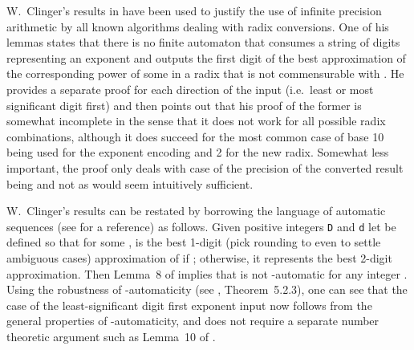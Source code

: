 \documentclass[12pt]{article}
\begin{document}
W.~Clinger's results in \cite{Clinger} have been used to justify the
use of infinite precision 
arithmetic by all known algorithms dealing with radix
conversions. One of his lemmas states that there
is no finite automaton that consumes a string of digits representing
an exponent and outputs the first digit of the best approximation of
the corresponding power of some {\ttD} in a radix that is not
commensurable with {\ttD}. He provides a separate proof for each direction of the input 
(i.e.~least or most significant digit first) and then points
out that his proof of the former is
somewhat incomplete in the sense that it does not work for all possible radix
combinations, although it does succeed for the most common case of base 10
being used for the exponent encoding and 2 for the new radix. Somewhat less important,
the proof only deals with case of the precision
of the converted result being  and not  as would seem
intuitively sufficient.

\iffalse
W.~Clinger's results can be restated by borrowing the language of automatic
sequences (see \cite{Allouche} for a reference) as follows.
Given positive integers {\tt D} and {\tt d} let  be
defined so that for some ,  is the best
1-digit (for simplicity, assume , and pick rounding to even
to settle ambiguous cases) approximation of
. Then Lemma~8 of \cite{Clinger} implies that 
 is not -automatic for any integer
. Using the robustness of -automaticity (see
\cite{Allouche}, Theorem~5.2.3), one can see that the case of the
least-significant digit first exponent input now follows from the general
properties of -automaticity, and does not require a separate
number theoretic argument such as Lemma~10 of \cite{Clinger}. 
\fi

W.~Clinger's results can be restated by borrowing the language of automatic
sequences (see \cite{Allouche} for a reference) as follows.
Given positive integers {\tt D} and {\tt d} let  be
defined so that for some ,  is the best
1-digit (pick rounding to even to settle ambiguous cases)
approximation of  if ;
otherwise, it represents the best 2-digit approximation.
Then Lemma~8 of \cite{Clinger} implies that 
 is not -automatic for any integer
. Using the robustness of -automaticity (see
\cite{Allouche}, Theorem~5.2.3), one can see that the case of the
least-significant digit first exponent input now follows from the general
properties of -automaticity, and does not require a separate
number theoretic argument such as Lemma~10 of \cite{Clinger}. 
\end{document}
